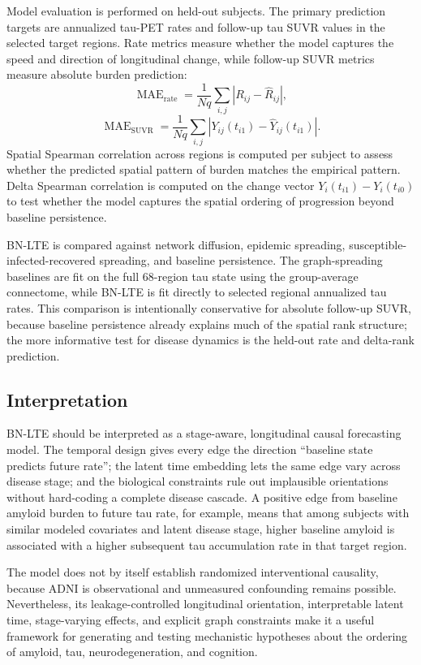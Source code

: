 Model evaluation is performed on held-out subjects. The primary prediction
targets are annualized tau-PET rates and follow-up tau SUVR values in the
selected target regions. Rate metrics measure whether the model captures the
speed and direction of longitudinal change, while follow-up SUVR metrics measure
absolute burden prediction:
\begin{equation}
\operatorname{MAE}_{\mathrm{rate}}
=
\frac{1}{Nq}
\sum_{i,j}
\left|
R_{ij}-\widehat{R}_{ij}
\right|,
\end{equation}
\begin{equation}
\operatorname{MAE}_{\mathrm{SUVR}}
=
\frac{1}{Nq}
\sum_{i,j}
\left|
Y_{ij}(t_{i1})-\widehat{Y}_{ij}(t_{i1})
\right|.
\end{equation}
Spatial Spearman correlation across regions is computed per subject to assess
whether the predicted spatial pattern of burden matches the empirical pattern.
Delta Spearman correlation is computed on the change vector
$Y_i(t_{i1})-Y_i(t_{i0})$ to test whether the model captures the spatial
ordering of progression beyond baseline persistence.

BN-LTE is compared against network diffusion, epidemic spreading,
susceptible-infected-recovered spreading, and baseline persistence. The
graph-spreading baselines are fit on the full 68-region tau state using the
group-average connectome, while BN-LTE is fit directly to selected regional
annualized tau rates. This comparison is intentionally conservative for
absolute follow-up SUVR, because baseline persistence already explains much of
the spatial rank structure; the more informative test for disease dynamics is
the held-out rate and delta-rank prediction.

\subsection{Interpretation}

BN-LTE should be interpreted as a stage-aware, longitudinal causal forecasting
model. The temporal design gives every edge the direction ``baseline state
predicts future rate''; the latent time embedding lets the same edge vary across
disease stage; and the biological constraints rule out implausible orientations
without hard-coding a complete disease cascade. A positive edge from baseline
amyloid burden to future tau rate, for example, means that among subjects with
similar modeled covariates and latent disease stage, higher baseline amyloid is
associated with a higher subsequent tau accumulation rate in that target
region.

The model does not by itself establish randomized interventional causality,
because ADNI is observational and unmeasured confounding remains possible.
Nevertheless, its leakage-controlled longitudinal orientation, interpretable
latent time, stage-varying effects, and explicit graph constraints make it a
useful framework for generating and testing mechanistic hypotheses about the
ordering of amyloid, tau, neurodegeneration, and cognition.
